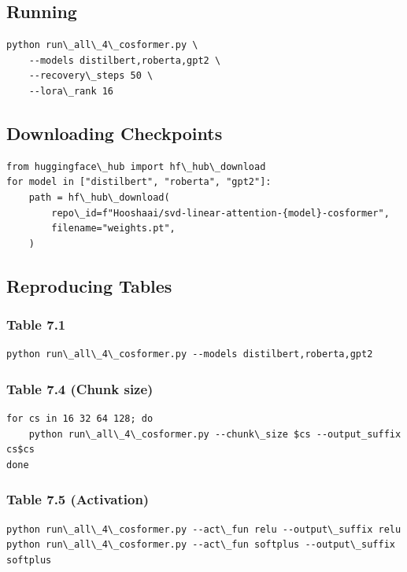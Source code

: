 \subsection{Running}

\begin{lstlisting}
python run\_all\_4\_cosformer.py \
    --models distilbert,roberta,gpt2 \
    --recovery\_steps 50 \
    --lora\_rank 16
\end{lstlisting}

\subsection{Downloading Checkpoints}

\begin{lstlisting}
from huggingface\_hub import hf\_hub\_download
for model in ["distilbert", "roberta", "gpt2"]:
    path = hf\_hub\_download(
        repo\_id=f"Hooshaai/svd-linear-attention-{model}-cosformer",
        filename="weights.pt",
    )
\end{lstlisting}

\subsection{Reproducing Tables}

\subsubsection{Table 7.1}

\begin{lstlisting}
python run\_all\_4\_cosformer.py --models distilbert,roberta,gpt2
\end{lstlisting}

\subsubsection{Table 7.4 (Chunk size)}

\begin{lstlisting}
for cs in 16 32 64 128; do
    python run\_all\_4\_cosformer.py --chunk\_size $cs --output_suffix cs$cs
done
\end{lstlisting}

\subsubsection{Table 7.5 (Activation)}

\begin{lstlisting}
python run\_all\_4\_cosformer.py --act\_fun relu --output\_suffix relu
python run\_all\_4\_cosformer.py --act\_fun softplus --output\_suffix softplus
\end{lstlisting}

